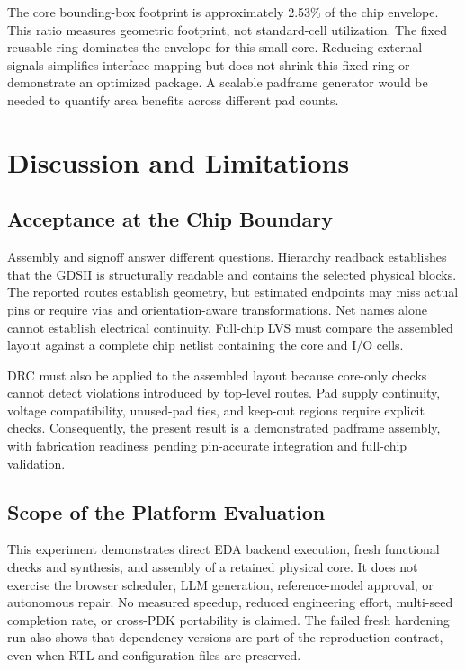 \documentclass[conference,letterpaper]{IEEEtran}
\begin{document}
The core bounding-box footprint is approximately 2.53\% of the chip envelope. This ratio measures geometric footprint, not standard-cell utilization. The fixed reusable ring dominates the envelope for this small core. Reducing external signals simplifies interface mapping but does not shrink this fixed ring or demonstrate an optimized package. A scalable padframe generator would be needed to quantify area benefits across different pad counts.

\section{Discussion and Limitations}
\subsection{Acceptance at the Chip Boundary}
Assembly and signoff answer different questions. Hierarchy readback establishes that the GDSII is structurally readable and contains the selected physical blocks. The reported routes establish geometry, but estimated endpoints may miss actual pins or require vias and orientation-aware transformations. Net names alone cannot establish electrical continuity. Full-chip LVS must compare the assembled layout against a complete chip netlist containing the core and I/O cells.

DRC must also be applied to the assembled layout because core-only checks cannot detect violations introduced by top-level routes. Pad supply continuity, voltage compatibility, unused-pad ties, and keep-out regions require explicit checks. Consequently, the present result is a demonstrated padframe assembly, with fabrication readiness pending pin-accurate integration and full-chip validation.

\subsection{Scope of the Platform Evaluation}
This experiment demonstrates direct EDA backend execution, fresh functional checks and synthesis, and assembly of a retained physical core. It does not exercise the browser scheduler, LLM generation, reference-model approval, or autonomous repair. No measured speedup, reduced engineering effort, multi-seed completion rate, or cross-PDK portability is claimed. The failed fresh hardening run also shows that dependency versions are part of the reproduction contract, even when RTL and configuration files are preserved.
\end{document}
